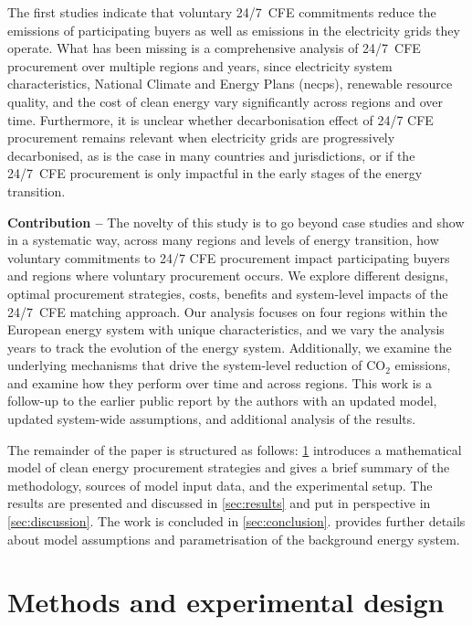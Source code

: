 \documentclass[11pt, 5p, nopreprintline]{elsarticle}
\begin{document}
The first studies indicate that voluntary 24/7~CFE commitments reduce the emissions of participating buyers as well as emissions in the electricity grids they operate.
What has been missing is a comprehensive analysis of 24/7~CFE procurement over multiple regions and years, since electricity system characteristics, National Climate and Energy Plans (\gls{necp}s), renewable resource quality, and the cost of clean energy vary significantly across regions and over time.
Furthermore, it is unclear whether decarbonisation effect of 24/7 CFE procurement remains relevant when electricity grids are progressively decarbonised, as is the case in many countries and jurisdictions, or if the 24/7~CFE procurement is only impactful in the early stages of the energy transition.


\textbf{Contribution --} The novelty of this study is to go beyond case studies and show in a systematic way, across many regions and levels of energy transition, how voluntary commitments to 24/7 CFE procurement impact participating buyers and regions where voluntary procurement occurs.
We explore different designs, optimal procurement strategies, costs, benefits and system-level impacts of the 24/7~CFE matching approach.
Our analysis focuses on four regions within the European energy system with unique characteristics, and we vary the analysis years to track the evolution of the energy system.
Additionally, we examine the underlying mechanisms that drive the system-level reduction of CO$_2$ emissions, and examine how they perform over time and across regions.
This work is a follow-up to the earlier public report by the authors \cite{riepin-zenodo-systemlevel247} with an updated model, updated system-wide assumptions, and additional analysis of the results.


The remainder of the paper is structured as follows: \cref{sec:methods} introduces a mathematical model of clean energy procurement strategies and gives a brief summary of the methodology, sources of model input data, and the experimental setup.
The results are presented and discussed in \cref{sec:results} and put in perspective in \cref{sec:discussion}.
The work is concluded in \cref{sec:conclusion}.
 provides further details about model assumptions and parametrisation of the background energy system.

\section{Methods and experimental design}
\label{sec:methods}
\end{document}
